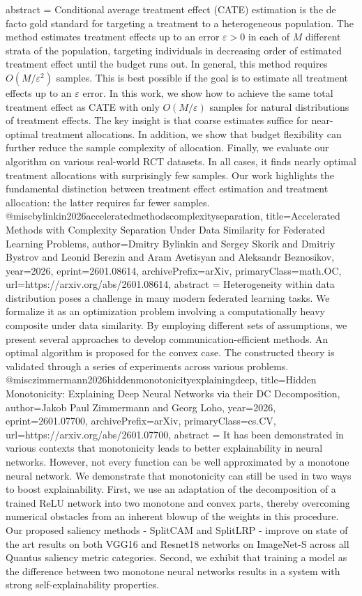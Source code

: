 {      abstract = {Conditional average treatment effect (CATE) estimation is the de facto gold standard for targeting a treatment to a heterogeneous population. The method estimates treatment effects up to an error $ε> 0$ in each of $M$ different strata of the population, targeting individuals in decreasing order of estimated treatment effect until the budget runs out. In general, this method requires $O(M/ε^2)$ samples. This is best possible if the goal is to estimate all treatment effects up to an $ε$ error. In this work, we show how to achieve the same total treatment effect as CATE with only $O(M/ε)$ samples for natural distributions of treatment effects. The key insight is that coarse estimates suffice for near-optimal treatment allocations. In addition, we show that budget flexibility can further reduce the sample complexity of allocation. Finally, we evaluate our algorithm on various real-world RCT datasets. In all cases, it finds nearly optimal treatment allocations with surprisingly few samples. Our work highlights the fundamental distinction between treatment effect estimation and treatment allocation: the latter requires far fewer samples.}
}@misc{bylinkin2026acceleratedmethodscomplexityseparation,
      title={Accelerated Methods with Complexity Separation Under Data Similarity for Federated Learning Problems}, 
      author={Dmitry Bylinkin and Sergey Skorik and Dmitriy Bystrov and Leonid Berezin and Aram Avetisyan and Aleksandr Beznosikov},
      year={2026},
      eprint={2601.08614},
      archivePrefix={arXiv},
      primaryClass={math.OC},
      url={https://arxiv.org/abs/2601.08614},
      abstract = {Heterogeneity within data distribution poses a challenge in many modern federated learning tasks. We formalize it as an optimization problem involving a computationally heavy composite under data similarity. By employing different sets of assumptions, we present several approaches to develop communication-efficient methods. An optimal algorithm is proposed for the convex case. The constructed theory is validated through a series of experiments across various problems.}
}@misc{zimmermann2026hiddenmonotonicityexplainingdeep,
      title={Hidden Monotonicity: Explaining Deep Neural Networks via their DC Decomposition}, 
      author={Jakob Paul Zimmermann and Georg Loho},
      year={2026},
      eprint={2601.07700},
      archivePrefix={arXiv},
      primaryClass={cs.CV},
      url={https://arxiv.org/abs/2601.07700},
      abstract = {It has been demonstrated in various contexts that monotonicity leads to better explainability in neural networks. However, not every function can be well approximated by a monotone neural network. We demonstrate that monotonicity can still be used in two ways to boost explainability. First, we use an adaptation of the decomposition of a trained ReLU network into two monotone and convex parts, thereby overcoming numerical obstacles from an inherent blowup of the weights in this procedure. Our proposed saliency methods - SplitCAM and SplitLRP - improve on state of the art results on both VGG16 and Resnet18 networks on ImageNet-S across all Quantus saliency metric categories. Second, we exhibit that training a model as the difference between two monotone neural networks results in a system with strong self-explainability properties.}
}
